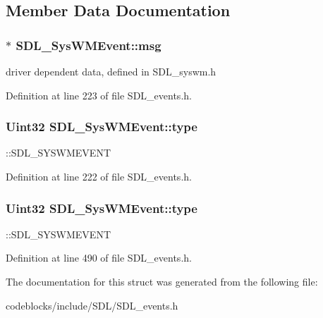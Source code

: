 \subsection{Member Data Documentation}
\hypertarget{structSDL__SysWMEvent_a90250ea9b87c21044da19adeadb5c847}{
\subsubsection[{msg}]{ $\ast$ S\+D\+L\+\_\+\+Sys\+W\+M\+Event\+::msg}}\label{structSDL__SysWMEvent_a90250ea9b87c21044da19adeadb5c847}
driver dependent data, defined in S\+D\+L\+\_\+syswm.\+h 

Definition at line 223 of file S\+D\+L\+\_\+events.\+h.

\hypertarget{structSDL__SysWMEvent_a84697e96cb16bf6a570e10b5bfdcd392}{
\subsubsection[{type}]{\setlength{\rightskip}{0pt plus 5cm}Uint32 S\+D\+L\+\_\+\+Sys\+W\+M\+Event\+::type}}\label{structSDL__SysWMEvent_a84697e96cb16bf6a570e10b5bfdcd392}
\+::\+S\+D\+L\+\_\+\+S\+Y\+S\+W\+M\+E\+V\+E\+N\+T 

Definition at line 222 of file S\+D\+L\+\_\+events.\+h.

\hypertarget{structSDL__SysWMEvent_a84697e96cb16bf6a570e10b5bfdcd392}{
\subsubsection[{type}]{\setlength{\rightskip}{0pt plus 5cm}Uint32 S\+D\+L\+\_\+\+Sys\+W\+M\+Event\+::type}}\label{structSDL__SysWMEvent_a84697e96cb16bf6a570e10b5bfdcd392}
\+::\+S\+D\+L\+\_\+\+S\+Y\+S\+W\+M\+E\+V\+E\+N\+T 

Definition at line 490 of file S\+D\+L\+\_\+events.\+h.



The documentation for this struct was generated from the following file\+:\begin{DoxyCompactItemize}
\item 
codeblocks/include/\+S\+D\+L/S\+D\+L\+\_\+events.\+h\end{DoxyCompactItemize}
